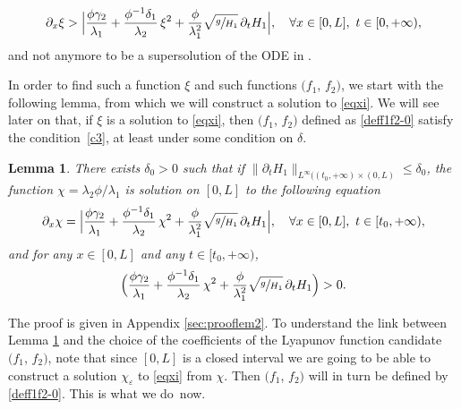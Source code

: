 \documentclass[JEP,XML,SOM,Unicode]{cedram}
\newtheorem{lem}[thm]{Lemma}
\theoremstyle{definition}
\begin{document}
\begin{equation}
\label{eqxi}
\partial_{x}\xi >\Bigl|\frac{\phi\gamma_{2}}{\lambda_{1}}+\frac{\phi^{-1}\delta_{1}}{\lambda_{2}}\,\xi^{2}+{\frac{\phi}{\lambda_{1}^{2}}}\sqrt{\sfrac{g}{H_{1}}}\,\partial_{t} H_{1}\Bigr|,\quad \forall x\in[0,L],\ t\in[0,+\infty),
\end{equation}
and not anymore to be a supersolution of the ODE in \cite{BastinCoron22}.

In order to find such {a function $\xi$ and such functions $(f_{1}$, $f_{2})$, we start with} the following lemma, {from which we will construct a solution to \eqref{eqxi}. We will see later on that, if $\xi$ is a solution to \eqref{eqxi}, then $(f_{1}$, $f_{2})$ defined as \eqref{deff1f2-0} satisfy the condition~\eqref{c3}, at least under some condition on $\delta$.}
\begin{lem}
There exists $\delta_{0}>0$ such that if $\lVert\partial_{t}H_{1}\rVert_{L^{\infty}(({t_{0}},+\infty)\times(0,L)}\leq \delta_{0}$,
the function $\chi={\lambda_{2}\phi}/\lambda_{1}$ is solution on $[0,L]$ to the following equation
\begin{equation}
\partial_{x}\chi
=\Bigl|\frac{\phi\gamma_{2}}{\lambda_{1}}+\frac{\phi^{-1}\delta_{1}}{\lambda_{2}}\,\chi^{2}+{\frac{\phi}{\lambda_{1}^{2}}}\sqrt{\sfrac{g}{H_{1}}}\,\partial_{t} H_{1}\Bigr|, \quad\forall x\in[0,L],\ t\in[{t_{0}},+\infty),
\label{eqg}
\end{equation}
and for any $x\in[0,L]$ and any $t\in[{t_{0}},+\infty)$,
\begin{equation}
\Bigl(\frac{\phi\gamma_{2}}{\lambda_{1}}+\frac{\phi^{-1}\delta_{1}}{\lambda_{2}}\,\chi^{2}+{\frac{\phi}{\lambda_{1}^{2}}}\sqrt{\sfrac{g}{H_{1}}}\,\partial_{t} H_{1}\Bigr)>0.
\label{positivity}
\end{equation}
\label{lem2}
\end{lem}
The proof is given in Appendix {\ref{sec:prooflem2}}.
To understand the link between Lemma \ref{lem2} {and the choice of the coefficients of the Lyapunov function candidate $(f_{1}$, $f_{2})$, note that since $[0,L]$ is a closed interval we are going to be able to construct a solution $\chi_{\varepsilon}$ to \eqref{eqxi} from $\chi$. Then $(f_{1}$, $f_{2})$ will in turn be defined by \eqref{deff1f2-0}. This is what we do~now.}
\end{document}
